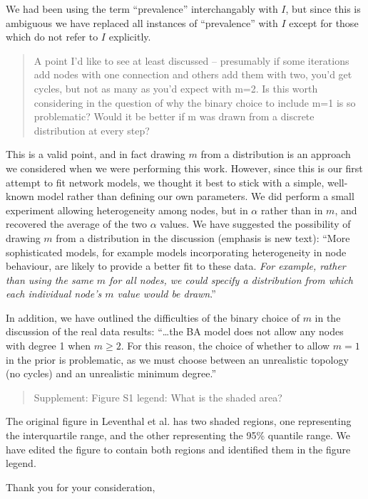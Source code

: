 \documentclass[12pt]{letter}
\begin{document}
\begin{letter}{ }
We had been using the term ``prevalence'' interchangably with $I$, but since
this is ambiguous we have replaced all instances of ``prevalence'' with $I$
except for those which do not refer to $I$ explicitly.

\begin{quote}
  \itshape

  A point I’d like to see at least discussed – presumably if some iterations
  add nodes with one connection and others add them with two, you’d get cycles,
  but not as many as you’d expect with m=2. Is this worth considering in the
  question of why the binary choice to include m=1 is so problematic? Would it
  be better if m was drawn from a discrete distribution at every step?
\end{quote}

This is a valid point, and in fact drawing $m$ from a distribution is an
approach we considered when we were performing this work. However, since this
is our first attempt to fit network models, we thought it best to stick with
a simple, well-known model rather than defining our own parameters. We did
perform a small experiment allowing heterogeneity among nodes, but in $\alpha$
rather than in $m$, and recovered the average of the two $\alpha$ values. We
have suggested the possibility of drawing $m$ from a distribution in the
discussion (emphasis is new text): ``More sophisticated models, for example
models incorporating heterogeneity in node behaviour, are likely to provide a
better fit to these data. \emph{For example, rather than using the same $m$ for
all nodes, we could specify a distribution from which each individual
node's $m$ value would be drawn}.''

In addition, we have outlined the difficulties of the binary choice of $m$ in
the discussion of the real data results: ``\ldots the BA model does not allow
any nodes with degree 1 when $m \geq 2$. For this reason, the choice of whether
to allow $m = 1$ in the prior is problematic, as we must choose between an
unrealistic topology (no cycles) and an unrealistic minimum degree.''

\begin{quote}
  Supplement:
  Figure S1 legend: What is the shaded area?
\end{quote}

The original figure in Leventhal et al. has two shaded regions, one
representing the interquartile range, and the other representing the 95\%
quantile range. We have edited the figure to contain both regions and
identified them in the figure legend.

\closing{Thank you for your consideration,}
\end{letter}
\end{document}
